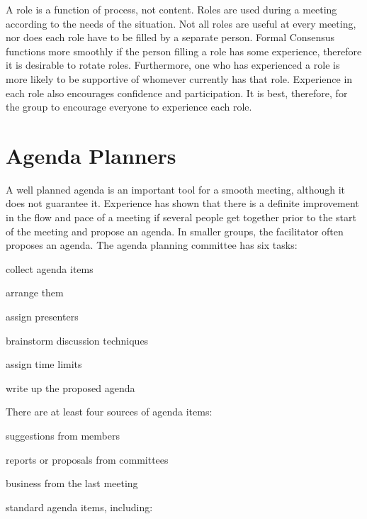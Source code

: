 A role is a function of process, not content. Roles are used
during a meeting according to the needs of the situation. Not all
roles are useful at every meeting, nor does each role have to be
filled by a separate person. Formal Consensus functions more
smoothly if the person filling a role has some experience,
therefore it is desirable to rotate roles. Furthermore, one who has
experienced a role is more likely to be supportive of whomever
currently has that role. Experience in each role also encourages
confidence and participation.  It is best, therefore, for the group
to encourage everyone to experience each role.

\section{Agenda Planners}

A well planned agenda is an important tool for a smooth meeting,
although it does not guarantee it. Experience has shown that there
is a definite improvement in the flow and pace of a meeting if
several people get together prior to the start of the meeting and
propose an agenda. In smaller groups, the facilitator often
proposes an agenda. The agenda planning committee has six tasks:

\squishitemize%

\item collect agenda items
\item arrange them
\item assign presenters
\item {}brainstorm discussion techniques
\item assign time limits
\item write up the proposed agenda
\squishend%

\noindent{}There are at least four sources of agenda items:

\squishitemize%

\item suggestions from members
\item reports or proposals from committees
\item business from the last meeting
\item {}standard agenda items, including:

